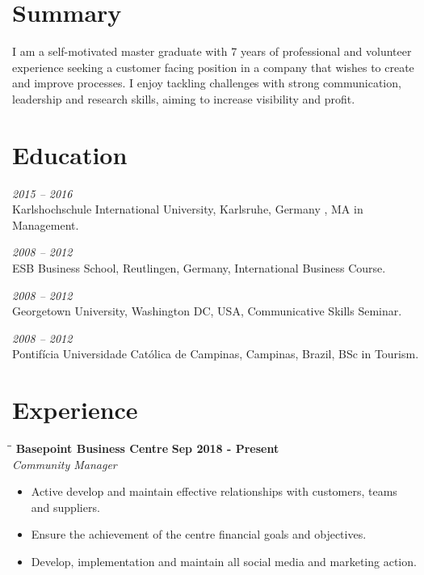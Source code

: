 \documentclass[margin]{res}
\begin{document}
  

\address{Brighton, UK \\ samyracsalek@gmail.com \\ Phone: +44 07305 759339 \\ Post Code: BN1 3TP }
                        
\begin{resume}                        

\section{Summary}

I am a self-motivated master graduate with 7 years of professional and
volunteer experience seeking a customer facing position in a company that
wishes to create and improve processes. I enjoy tackling challenges with
strong communication, leadership and research skills, aiming to increase
visibility and profit.

\section{Education}
\textit{2015 – 2016}\\
Karlshochschule International University, Karlsruhe, Germany , MA in Management.

\textit{2008 – 2012}\\
ESB Business School, Reutlingen, Germany, International Business Course.

\textit{2008 – 2012}\\
Georgetown University, Washington DC, USA, Communicative Skills Seminar.

\textit{2008 – 2012}\\
Pontifícia Universidade Católica de Campinas, Campinas, Brazil, BSc in Tourism.

\section{Experience}

\vspace{-0.1in}
    \begin{tabbing}
        \hspace{2.3in}\= \hspace{1.7in}\= \kill
        \textbf{Basepoint Business Centre} \>\>\textbf{Sep 2018 - Present}\\
        \textit{Community Manager}\\        
    \end{tabbing}\vspace{-20pt}
    \vspace{2mm}
    \begin{itemize}
        \item Active develop and maintain effective relationships with customers, teams and suppliers.
        \item Ensure the achievement of the centre financial goals and objectives.
        \item Develop, implementation and maintain all social media and marketing action.   
    \end{itemize}


\end{resume}
\end{document}
